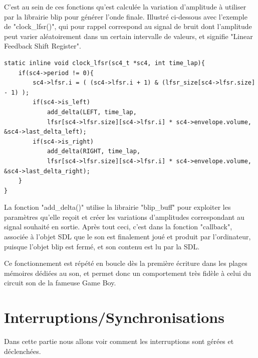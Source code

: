 \documentclass[french]{report}
\begin{document}
C'est au sein de ces fonctions qu'est calculée la variation d'amplitude à utiliser par la librairie blip pour générer l'onde finale.
Illustré ci-dessous avec l'exemple de "clock\_lfsr()", qui pour rappel correspond au signal de bruit dont l'amplitude peut varier aléatoirement dans 
un certain intervalle de valeurs, et signifie "Linear Feedback Shift Register".
\begin{lstlisting}
static inline void clock_lfsr(sc4_t *sc4, int time_lap){
	if(sc4->period != 0){
		sc4->lfsr.i = ( (sc4->lfsr.i + 1) & (lfsr_size[sc4->lfsr.size] - 1) );
		if(sc4->is_left)
			add_delta(LEFT, time_lap,
			lfsr[sc4->lfsr.size][sc4->lfsr.i] * sc4->envelope.volume, &sc4->last_delta_left);
		if(sc4->is_right)
			add_delta(RIGHT, time_lap,
			lfsr[sc4->lfsr.size][sc4->lfsr.i] * sc4->envelope.volume, &sc4->last_delta_right);
	}
}
\end{lstlisting}

La fonction "add\_delta()" utilise la librairie "blip\_buff" pour exploiter les paramètres qu'elle reçoit et créer 
les variations d'amplitudes correspondant au signal souhaité en sortie.
Après tout ceci, c'est dans la fonction "callback", associée à l'objet SDL que le son est finalement joué et produit par l'ordinateur, puisque l'objet blip est fermé, et son contenu est lu par la SDL.

Ce fonctionnement est répété en boucle dès la première écriture dans les plages mémoires dédiées au son, et permet donc un comportement très fidèle à celui du circuit son de la fameuse Game Boy.
\section{Interruptions/Synchronisations}
Dans cette partie nous allons voir comment les interruptions sont gérées et déclenchées. 
\end{document}
